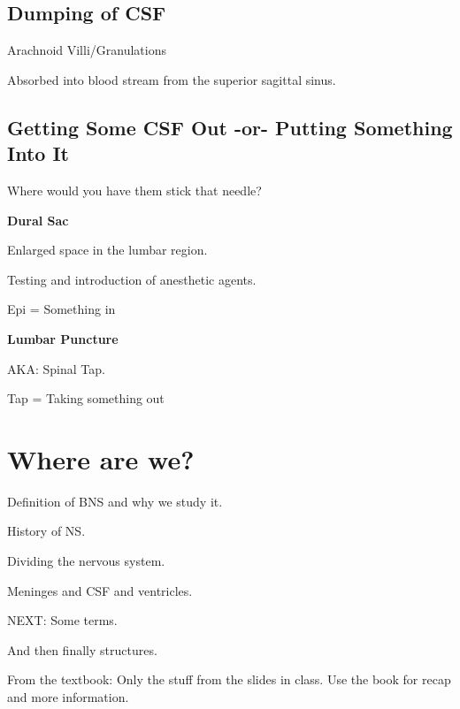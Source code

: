 \subsection{Dumping of CSF}

\begin{coloredlist}
    \item Arachnoid Villi/Granulations
    \begin{coloredlist}
        \item Absorbed into blood stream from the superior sagittal sinus.
    \end{coloredlist}
\end{coloredlist}

\subsection{Getting Some CSF Out -or- Putting Something Into It}

\begin{coloredlist}
    \item Where would you have them stick that needle?
    \begin{coloredlist}
        \item \textbf{Dural Sac}
        \begin{coloredlist}
            \item Enlarged space in the lumbar region.
            \item Testing and introduction of anesthetic agents.
            \item Epi = Something in
        \end{coloredlist}
        \item \textbf{Lumbar Puncture}
        \begin{coloredlist}
            \item AKA: Spinal Tap.
            \item Tap = Taking something out
        \end{coloredlist}
    \end{coloredlist}
\end{coloredlist}

\section{Where are we?}

\begin{coloredlist}
    \item Definition of BNS and why we study it.
    \item History of NS.
    \item Dividing the nervous system.
    \item Meninges and CSF and ventricles.
    \item NEXT: Some terms.
    \item And then finally structures.
    \item From the textbook: Only the stuff from the slides in class. Use the book for recap and more information.
\end{coloredlist}